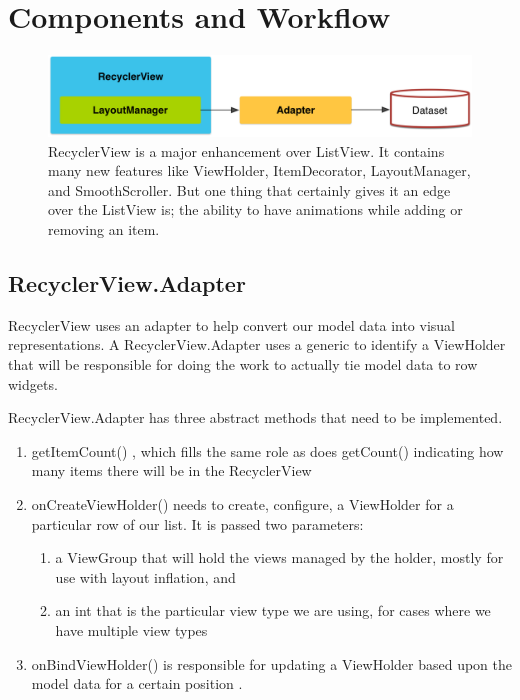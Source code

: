 \section{Components and Workflow}

\begin{figure}
	\includegraphics[width=\textwidth]{images/recycler/components.png}
	\caption{ RecyclerView is a major enhancement over ListView. It contains many new features like ViewHolder, ItemDecorator, LayoutManager, and SmoothScroller. But one thing that certainly gives it an edge over the ListView is; the ability to have animations while adding or removing an item. }
	\label{fig:recyclercomponents}
\end{figure}


\subsection{RecyclerView.Adapter}
RecyclerView uses an adapter to help convert our model data
into visual representations. A RecyclerView.Adapter  uses a generic to identify a ViewHolder that will be responsible for doing the work to actually tie
model data to row widgets.

RecyclerView.Adapter has three abstract methods that need to be implemented.

\begin{enumerate}
	\item getItemCount() , which fills the same role as does getCount() indicating how many items there will be in the RecyclerView
	\item onCreateViewHolder()  needs to create, configure,
	a ViewHolder for a particular row of our list. It is passed two parameters:
	\begin{enumerate}
		\item a ViewGroup that will hold the views managed by the holder, mostly for use
		with layout inflation, and
		\item an int that is the particular view type we are using, for cases where we have
		multiple view types
	\end{enumerate}
	\item onBindViewHolder()
	is responsible for updating a ViewHolder based upon the
	model data for a certain position .
\end{enumerate}

